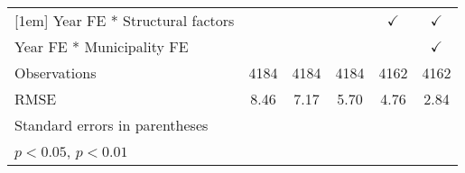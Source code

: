 \begin{table}[htbp]
\begin{tabular}{l*{5}{c}}
[1em]
Year FE * Structural factors&                    &                    &                    &$\checkmark$        &$\checkmark$        \\
[1em]
Year FE * Municipality FE&                    &                    &                    &                    &$\checkmark$        \\
\hline
Observations        &        4184        &        4184        &        4184        &        4162        &        4162        \\
RMSE                &        8.46        &        7.17        &        5.70        &        4.76        &        2.84        \\
\hline\hline
\multicolumn{6}{l}{\footnotesize Standard errors in parentheses}\\
\multicolumn{6}{l}{\footnotesize \sym{*} \(p<0.05\), \sym{**} \(p<0.01\)}\\
\end{tabular}
\end{table}
